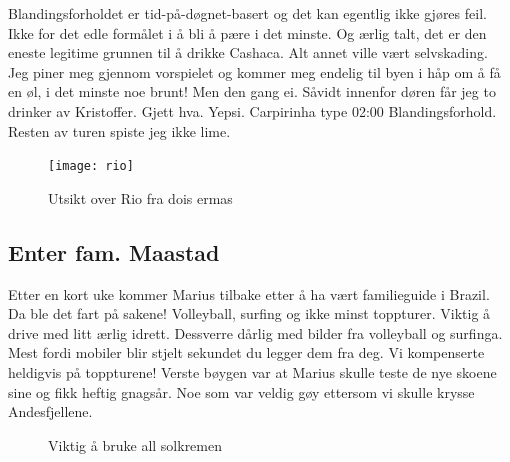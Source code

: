 Blandingsforholdet er tid-på-døgnet-basert og det kan egentlig ikke
gjøres feil. Ikke for det edle formålet i å bli å pære i det minste.
Og ærlig talt, det er den eneste legitime grunnen til å drikke
Cashaca. Alt annet ville vært selvskading. Jeg piner meg gjennom
vorspielet og kommer meg endelig til byen i håp om å få en øl, i det
minste noe brunt! Men den gang ei. Såvidt innenfor døren får jeg to
drinker av Kristoffer. Gjett hva. Yepsi. Carpirinha type 02:00
Blandingsforhold. Resten av turen spiste jeg ikke lime.
\begin{figure}[H]
	\centering
	\texttt{[image: rio]}
	\caption{Utsikt over Rio fra dois ermas}
	\label{fig:dois}
\end{figure}
\subsection*{Enter fam. Maastad}
Etter en kort uke kommer Marius tilbake etter å ha vært familieguide i
Brazil. Da ble det fart på sakene!
Volleyball, surfing og ikke minst toppturer. Viktig å drive med litt
ærlig idrett. Dessverre dårlig med bilder fra volleyball og surfinga.
Mest fordi mobiler blir stjelt sekundet du legger dem fra deg. Vi
kompenserte heldigvis på toppturene! Verste bøygen var at Marius
skulle teste de nye skoene sine og fikk heftig gnagsår. Noe som var
veldig gøy ettersom vi skulle krysse Andesfjellene. 

\begin{figure}[H]
	\centering
	
	\noindent{}
	\caption{Viktig å bruke all solkremen}
\label{fig:predradegavea}
\end{figure}

